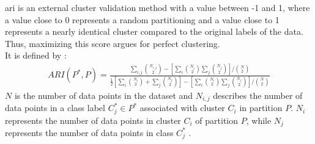 \acrshort{ari} is an external cluster validation method with a value between -1 and 1, where a value close to 0 represents a random partitioning and a value close to 1 represents a nearly identical cluster compared to the original labels of the data. Thus, maximizing this score argues for perfect clustering.\\
It is defined by \cite{ari}: 
\begin{align}
    ARI(P^*,P) = \frac{\sum_{i,j}\binom{N_{i,j}}{2}-[\sum_{i}\binom{N_{i}}{2}\sum_{j}\binom{N_{j}}{2}]/\binom{N}{2}}{\frac{1}{2}[\sum_{i}\binom{N_{i}}{2}+\sum_{j}\binom{N_{j}}{2}]-[\sum_{i}\binom{N_{i}}{2}\sum_{j}\binom{N_{j}}{2}]/\binom{N}{2}}
\end{align}
$N$ is the number of data points in the dataset and $N_{i,j}$ describes the number of data points in a class label $C_j^* \in P^*$ associated with cluster $C_i$ in partition $P$. $N_i$ represents the number of data points in cluster $C_i$ of partition $P$, while $N_j$ represents the number of data points in class $C_j^*$ \cite{ari}. 